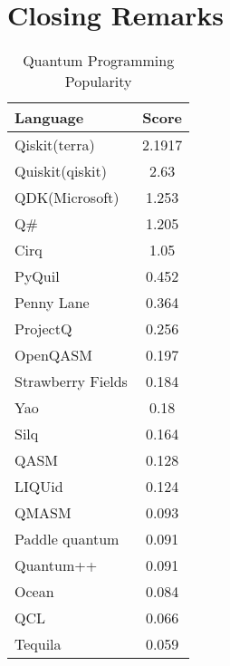 \documentclass[conference]{IEEEtran}
\begin{document}
\section{Closing Remarks}

\begin{table}[h!]
  \begin{center}
    \caption{Quantum Programming Popularity}
    \label{tab:table1}
    \begin{tabular}{l|c} %
      \textbf{Language} & \textbf{Score}\\
      \hline
      Qiskit(terra) & 2.1917\\
      Quiskit(qiskit) & 2.63\\
      QDK(Microsoft) & 1.253 \\
      Q\# & 1.205 \\
      Cirq & 1.05 \\
      PyQuil & 0.452 \\
      Penny Lane & 0.364 \\
      ProjectQ & 0.256 \\
      OpenQASM & 0.197 \\
      Strawberry Fields & 0.184 \\
      Yao & 0.18 \\
      Silq & 0.164 \\
      QASM & 0.128 \\
      LIQUid & 0.124 \\
      QMASM & 0.093 \\
      Paddle quantum & 0.091 \\
      Quantum++ & 0.091 \\
      Ocean & 0.084 \\
      QCL & 0.066 \\
      Tequila & 0.059 \\
    \end{tabular}
  \end{center}
\end{table}
\end{document}
